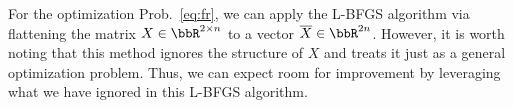 \documentclass[dvipdfmx,10pt,journal,compsoc]{IEEEtran}
\newcommand{\red}[1]{\textcolor{red}{#1}}
\begin{document}
For the optimization Prob.~\eqref{eq:fr}, we can apply the L-BFGS algorithm via flattening the matrix $X \in \bbR^{2 \times n}$ to a vector $\overline{X} \in \bbR^{2n}$.
However, it is worth noting that this method ignores the structure of $X$ and treats it just as a general optimization problem.
Thus, we can expect room for improvement by leveraging what we have ignored in this L-BFGS algorithm.




\end{document}
